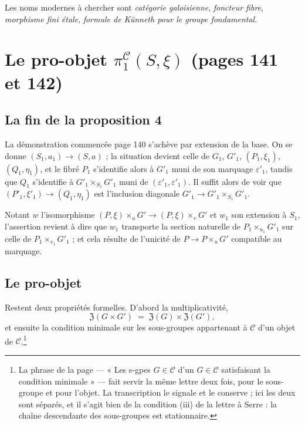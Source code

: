 \documentclass[11pt,a4paper]{article}
\begin{document}
\begin{resume}
Les noms modernes à chercher sont \emph{catégorie galoisienne}, \emph{foncteur
fibre}, \emph{morphisme fini étale}, \emph{formule de Künneth pour le groupe
fondamental}.

\end{resume}

\section*{Le pro-objet $\pi_{1}^{\mathcal{C}}(S,\xi)$ (pages 141 et 142)}

\subsection*{La fin de la proposition 4}

La démonstration commencée page 140 s'achève par extension de la base. On se
donne $(S_{1}, a_{1}) \to (S, a)$ ; la situation devient celle de $G_{1}$,
$G'_{1}$, $(P_{1}, \xi_{1})$, $(Q_{1}, \eta_{1})$, et le fibré $P_{1}$
s'identifie alors à $G'_{1}$ muni de son marquage $\varepsilon'_{1}$, tandis que
$Q_{1}$ s'identifie à $G'_{1} \times_{S_{1}} G'_{1}$ muni de
$(\varepsilon'_{1}, \varepsilon'_{1})$. Il suffit alors de voir que
$(P'_{1}, \xi'_{1}) \to (Q_{1}, \eta_{1})$ est l'inclusion diagonale
$G'_{1} \to G'_{1} \times_{S_{1}} G'_{1}$.

Notant $w$ l'isomorphisme $(P, \xi) \times_{u} G' \to (P, \xi) \times_{v} G'$
et $w_{1}$ son extension à $S_{1}$, l'assertion revient à dire que $w_{1}$
transporte la section naturelle de $P_{1} \times_{u_{1}} G'_{1}$ sur celle de
$P_{1} \times_{v_{1}} G'_{1}$ ; et cela résulte de l'unicité de
$P \to P \times_{u} G'$ compatible au marquage.


\subsection*{Le pro-objet}

Restent deux propriétés formelles. D'abord la multiplicativité,
\[
  \mathfrak{Z}(G \times G') \;=\; \mathfrak{Z}(G) \times \mathfrak{Z}(G') ,
\]
et ensuite la condition minimale sur les sous-groupes appartenant à
$\mathcal{C}$ d'un objet de $\mathcal{C}$.\footnote{La phrase de la page ---
« Les s-gpes $G \in \mathcal{C}$ d'un $G \in \mathcal{C}$ satisfaisant la
condition minimale » --- fait servir la même lettre deux fois, pour le
sous-groupe et pour l'objet. La transcription le signale et le conserve ; ici
les deux sont séparés, et il s'agit bien de la condition (iii) de la lettre à
Serre : la chaîne descendante des sous-groupes est stationnaire.}
\end{document}
